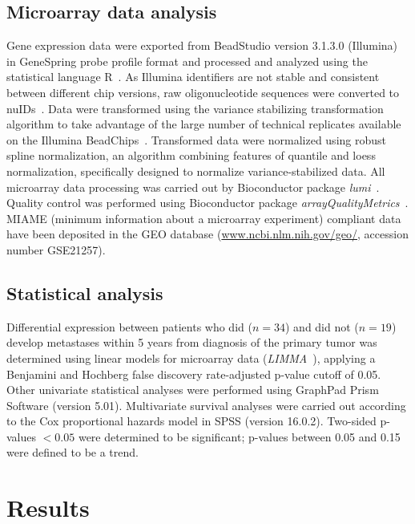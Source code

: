 \subsection{Microarray data analysis}
Gene expression data were exported from BeadStudio
version 3.1.3.0 (Illumina) in GeneSpring probe profile
format and processed and analyzed using the statistical
language R~\cite{r2.9.0}. As Illumina identifiers are not stable and
consistent between different chip versions, raw oligonucleotide
sequences were converted to nuIDs~\cite{du2007nuid}. Data
were transformed using the variance stabilizing transformation
algorithm to take advantage of the large number of
technical replicates available on the Illumina BeadChips~\cite{lin2008model}.
Transformed data were normalized using robust
spline normalization, an algorithm combining features
of quantile and loess normalization, specifically designed
to normalize variance\hyp{}stabilized data. All microarray data
processing was carried out by Bioconductor package {\it lumi}~\cite{gentleman2004bioconductor,du2008lumi}.
Quality control was performed using Bioconductor
package {\it arrayQualityMetrics}~\cite{kauffmann2009arrayqualitymetrics}. MIAME (minimum
information about a microarray experiment) compliant
data have been deposited in the GEO database (\url{www.ncbi.nlm.nih.gov/geo/}, accession number GSE21257).

\subsection{Statistical analysis}
Differential expression between patients who did ($n=34$) and did not ($n=19$) develop metastases within 5 years
from diagnosis of the primary tumor was determined using
linear models for microarray data ({\it LIMMA}~\cite{smyth2004linear}), applying
a Benjamini and Hochberg false discovery rate\hyp{}adjusted p-value cutoff of 0.05. Other univariate statistical
analyses were performed using GraphPad Prism Software
(version 5.01). Multivariate survival analyses were carried
out according to the Cox proportional hazards model in
SPSS (version 16.0.2). Two\hyp{}sided p-values $<0.05$ were determined to be significant; p-values between 0.05 and
0.15 were defined to be a trend.

\section{Results}\label{results4}
